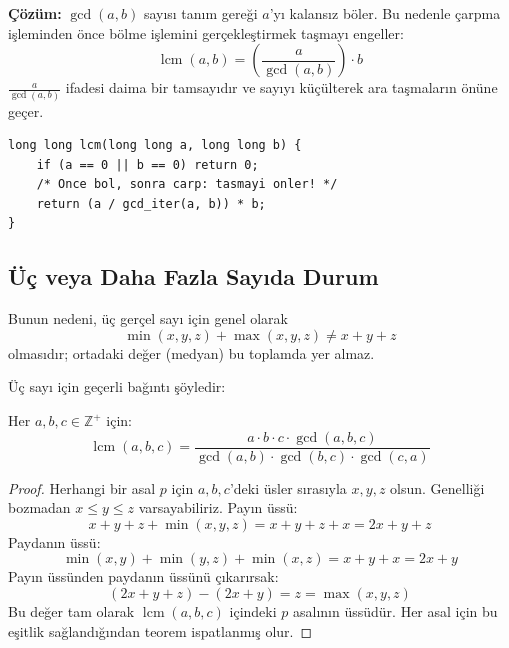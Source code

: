 \textbf{Çözüm:}
$\gcd(a, b)$ sayısı tanım gereği $a$'yı kalansız böler. Bu nedenle çarpma işleminden önce bölme işlemini gerçekleştirmek taşmayı engeller:
\[ \operatorname{lcm}(a, b) = \left( \frac{a}{\gcd(a, b)} \right) \cdot b \]
$\frac{a}{\gcd(a, b)}$ ifadesi daima bir tamsayıdır ve sayıyı küçülterek ara taşmaların önüne geçer.

\begin{lstlisting}[language=CTemel]
long long lcm(long long a, long long b) {
    if (a == 0 || b == 0) return 0;
    /* Once bol, sonra carp: tasmayi onler! */
    return (a / gcd_iter(a, b)) * b;
}
\end{lstlisting}

\subsection*{Üç veya Daha Fazla Sayıda Durum}

\noindent{}

Bunun nedeni, üç gerçel sayı için genel olarak
\[ \min(x, y, z) + \max(x, y, z) \neq x + y + z \]
olmasıdır; ortadaki değer (medyan) bu toplamda yer almaz.

Üç sayı için geçerli bağıntı şöyledir:

\begin{theorem}
Her $a, b, c \in \mathbb{Z}^+$ için:
\[ \operatorname{lcm}(a, b, c) = \frac{a \cdot b \cdot c \cdot \gcd(a, b, c)}{\gcd(a, b) \cdot \gcd(b, c) \cdot \gcd(c, a)} \]
\end{theorem}

\begin{proof}
Herhangi bir asal $p$ için $a, b, c$'deki üsler sırasıyla $x, y, z$ olsun. Genelliği bozmadan $x \le y \le z$ varsayabiliriz.
Payın üssü:
\[ x + y + z + \min(x, y, z) = x + y + z + x = 2x + y + z \]
Paydanın üssü:
\[ \min(x, y) + \min(y, z) + \min(x, z) = x + y + x = 2x + y \]
Payın üssünden paydanın üssünü çıkarırsak:
\[ (2x + y + z) - (2x + y) = z = \max(x, y, z) \]
Bu değer tam olarak $\operatorname{lcm}(a, b, c)$ içindeki $p$ asalının üssüdür. Her asal için bu eşitlik sağlandığından teorem ispatlanmış olur.
\end{proof}

